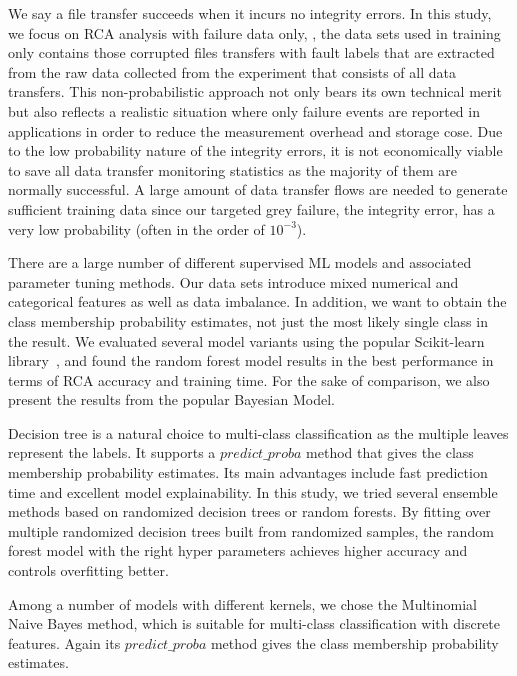 {We say a file transfer succeeds when it incurs no integrity errors. In this study, we focus on RCA analysis with failure data only, \ie, the data sets used in training only contains those corrupted files transfers with fault labels that are extracted from the raw data collected from the experiment that consists of all data transfers. This non-probabilistic approach not only bears its own technical merit but also reflects a realistic situation where only failure events are reported in applications in order to reduce the measurement overhead and storage cose. Due to the low probability nature of the integrity errors, it is not economically viable to save all data transfer monitoring statistics as the majority of them are normally successful.  A large amount of data transfer flows are needed to generate sufficient training data since our targeted grey failure, the integrity error, has a very low probability (often in the order of $10^{-3}$).

There are a large number of different supervised ML models and associated parameter tuning  methods. Our data sets introduce mixed numerical and categorical features as well as data imbalance. 
In addition, we want to obtain the class membership probability estimates, not just the most likely single class in the result. We evaluated several model variants using the popular Scikit-learn library~\cite{Scikit:web},  
and found the random forest model results in the best performance in terms of RCA accuracy and training time. For the sake of comparison, we also present the results from the popular Bayesian Model.

Decision tree is a natural choice to multi-class classification as the multiple leaves represent the labels. It supports a $predict\_proba$ method that gives the class membership probability estimates. 
Its main advantages include fast prediction time and excellent model explainability. In this study, we tried several ensemble methods based on randomized decision trees or random forests. 
By fitting over multiple randomized decision trees built from randomized samples, the random forest model with the right hyper parameters achieves higher accuracy and controls overfitting better. 

Among a number of models with different kernels, we chose the Multinomial Naive Bayes method, which is suitable for multi-class classification with discrete features. Again its $predict\_proba$ method gives the class membership probability estimates.

}

